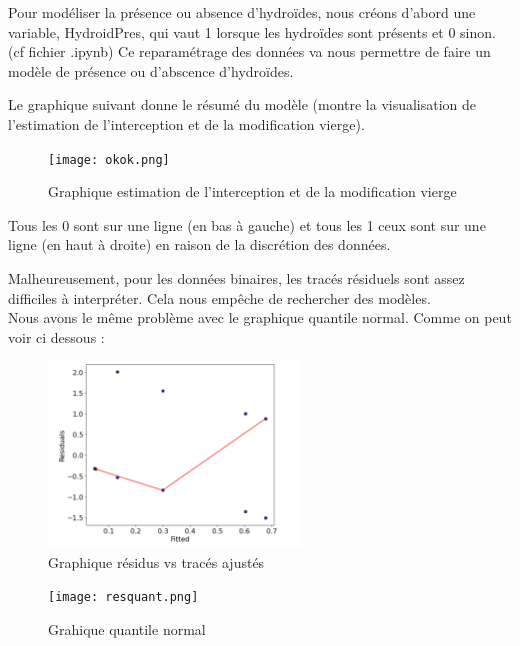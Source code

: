 \documentclass{article}
\theoremstyle{definition}
\begin{document}
Pour modéliser la présence ou absence d'hydroïdes, nous créons d'abord une variable, HydroidPres, qui vaut 1 lorsque les hydroïdes sont présents et 0 sinon. (cf fichier .ipynb)
Ce reparamétrage des données va nous permettre de faire un modèle de présence ou d'abscence d'hydroïdes.

\vspace{2cm}

Le graphique suivant donne le résumé du modèle (montre la visualisation de l'estimation de l'interception et de la modification vierge).

\begin{figure}[!h]
\texttt{[image: okok.png]}
\caption{Graphique estimation de l'interception et de la modification vierge}
\label{exemple somme}
\end{figure}

\vspace{2cm}

Tous les 0 sont sur une ligne (en bas à gauche) et tous les 1 ceux sont sur une ligne (en haut à droite) en raison de la discrétion des données.\\

\newpage

Malheureusement, pour les données binaires, les tracés résiduels sont assez difficiles à interpréter. 
Cela nous empêche de rechercher des modèles. \\
Nous avons le même problème avec le graphique quantile normal.
Comme on peut voir ci dessous :


\begin{center}
\begin{figure}[!h]
\centerline{\includegraphics[width=0.6\textwidth]{bonresfit.png}}
\caption{Graphique résidus vs tracés ajustés}
\label{exemple somme}
\end{figure}


\begin{figure}[!h]
\centerline{\texttt{[image: resquant.png]}}
\caption{Grahique quantile normal}
\label{exemple somme}
\end{figure}
\end{center}
\end{document}
